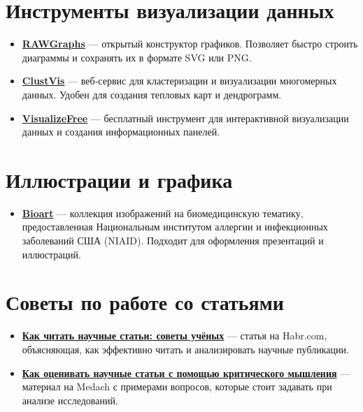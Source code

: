 \documentclass[
  russian,
  12pt,
  a4paper,
]{article}
\providecommand{\tightlist}{%
  \setlength{\itemsep}{0pt}\setlength{\parskip}{0pt}}
\begin{document}
\chapter{Инструменты визуализации
данных}\label{ux438ux43dux441ux442ux440ux443ux43cux435ux43dux442ux44b-ux432ux438ux437ux443ux430ux43bux438ux437ux430ux446ux438ux438-ux434ux430ux43dux43dux44bux445}

\begin{itemize}
\tightlist
\item
  \href{https://rawgraphs.io}{\textbf{RAWGraphs}} --- открытый
  конструктор графиков. Позволяет быстро строить диаграммы и сохранять
  их в формате SVG или PNG.
\item
  \href{https://biit.cs.ut.ee/clustvis/}{\textbf{ClustVis}} ---
  веб‑сервис для кластеризации и визуализации многомерных данных. Удобен
  для создания тепловых карт и дендрограмм.
\item
  \href{https://visualizefree.com}{\textbf{VisualizeFree}} ---
  бесплатный инструмент для интерактивной визуализации данных и создания
  информационных панелей.
\end{itemize}

\chapter{Иллюстрации и
графика}\label{ux438ux43bux43bux44eux441ux442ux440ux430ux446ux438ux438-ux438-ux433ux440ux430ux444ux438ux43aux430}

\begin{itemize}
\tightlist
\item
  \href{https://www.flickr.com/photos/niaid/}{\textbf{Bioart}} ---
  коллекция изображений на биомедицинскую тематику, предоставленная
  Национальным институтом аллергии и инфекционных заболеваний США
  (NIAID). Подходит для оформления презентаций и иллюстраций.
\end{itemize}

\chapter{Советы по работе со
статьями}\label{ux441ux43eux432ux435ux442ux44b-ux43fux43e-ux440ux430ux431ux43eux442ux435-ux441ux43e-ux441ux442ux430ux442ux44cux44fux43cux438}

\begin{itemize}
\item
  \href{https://habr.com/ru/post/example/}{\textbf{Как читать научные
  статьи: советы учёных}} --- статья на Habr.com, объясняющая, как
  эффективно читать и анализировать научные публикации.
\item
  \href{https://medach.pro/post/example}{\textbf{Как оценивать научные
  статьи с помощью критического мышления}} --- материал на Medach с
  примерами вопросов, которые стоит задавать при анализе исследований.
\end{itemize}
\end{document}

